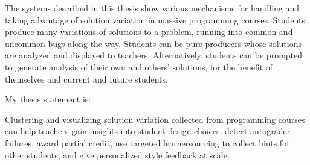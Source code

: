 The systems described in this thesis show various mechanisms for handling and taking advantage of solution variation in massive programming courses. Students produce many variations of solutions to a problem, running into common and uncommon bugs along the way. Students can be pure producers whose solutions are analyzed and displayed to teachers. Alternatively, students can be prompted to generate analysis of their own and others' solutions, for the benefit of themselves and current and future students. %

My thesis statement is: 
\begin{displayquote}
Clustering and visualizing solution variation collected from programming courses can help teachers gain insights into student design choices, detect autograder failures, award partial credit, use targeted learnersourcing to collect hints for other students, and give personalized style feedback at scale.
\end{displayquote}

